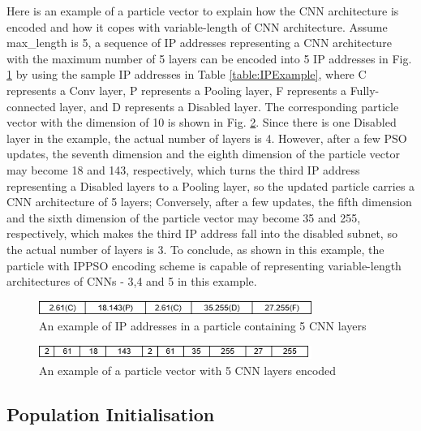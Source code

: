 \documentclass[conference]{IEEEtran}
\begin{document}
Here is an example of a particle vector to explain how the CNN architecture is encoded and how it copes with variable-length of CNN architecture. Assume max\_length is 5, a sequence of IP addresses representing a CNN architecture with the maximum number of 5 layers can be encoded into 5 IP addresses in Fig. \ref{fig:ParticleIP} by using the sample IP addresses in Table \ref{table:IPExample}, where C represents a Conv layer, P represents a Pooling layer, F represents a Fully-connected layer, and D represents a Disabled layer. The corresponding particle vector with the dimension of 10 is shown in Fig. \ref{fig:ParticleVector}. Since there is one Disabled layer in the example, the actual number of layers is 4. However, after a few PSO updates, the seventh dimension and the eighth dimension of the particle vector may become 18 and 143, respectively, which turns the third IP address representing a Disabled layers to a Pooling layer, so the updated particle carries a CNN architecture of 5 layers; Conversely, after a few updates, the fifth dimension and the sixth dimension of the particle vector may become 35 and 255, respectively, which makes the third IP address fall into the disabled subnet, so the actual number of layers is 3. To conclude, as shown in this example, the particle with IPPSO encoding scheme is capable of representing variable-length architectures of CNNs - 3,4 and 5 in this example. 


\begin{figure}[!t]
	\centering
	\includegraphics[width=3.5in]{ippso-encoding-i}
	\caption{An example of IP addresses in a particle containing 5 CNN layers}
	\label{fig:ParticleIP}
\end{figure}

\begin{figure}[!t]
	\centering
	\includegraphics[width=3.5in]{ippso-encoding-v}
	\caption{An example of a particle vector with 5 CNN layers encoded}
	\label{fig:ParticleVector}
\end{figure}

\subsection{Population Initialisation}
\end{document}
